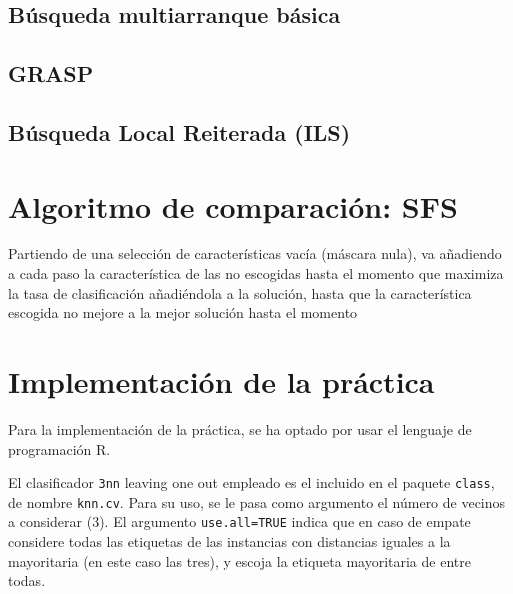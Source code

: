 \documentclass[a4paper,11pt]{article}
\begin{document}
\subsection{Búsqueda multiarranque básica}


\subsection{GRASP}


\subsection{Búsqueda Local Reiterada (ILS)}


\section{Algoritmo de comparación: SFS}
\small{\texttt{}}

Partiendo de una selección de características vacía (máscara nula), va añadiendo a cada paso la característica
de las no escogidas hasta el momento que maximiza la tasa de clasificación añadiéndola a la solución, hasta
que la característica escogida no mejore a la mejor solución hasta el momento

\section{Implementación de la práctica}
Para la implementación de la práctica, se ha optado por usar el lenguaje de programación R. 

El clasificador \texttt{3nn} leaving one out empleado es el incluido en el paquete \texttt{class}, de nombre
\texttt{knn.cv}. Para su uso, se le pasa como argumento el número de vecinos a considerar (3). El argumento 
\texttt{use.all=TRUE} indica que en caso de empate considere todas las etiquetas de las instancias con distancias 
iguales a la mayoritaria (en este caso las tres), y escoja la etiqueta mayoritaria de entre todas. 
\end{document}
